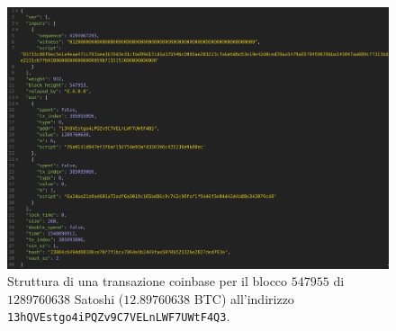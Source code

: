\begin{enumerate}[1.]
\begin{table}[H]
\end{table}
\begin{figure}[H]
    \centering
    \includegraphics[width=\textwidth]{images/coinbasetx.png}
    \caption{Struttura di una transazione coinbase per il blocco $547955$ di $1289760638$ Satoshi ($12.89760638$ BTC) all'indirizzo \texttt{13hQVEstgo4iPQZv9C7VELnLWF7UWtF4Q3}.}
\end{figure}


\end{enumerate}
